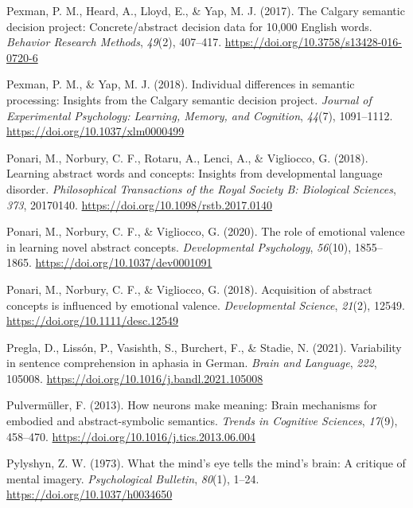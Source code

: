 \documentclass[
  12pt,
  man,floatsintext]{apa7}
\newlength{\cslhangindent}
\newlength{\cslentryspacingunit} %
\newenvironment{CSLReferences}[2] %
 {%
  \setlength{\parindent}{0pt}
  \ifodd #1
  \let\oldpar\par
  \def\par{\hangindent=\cslhangindent\oldpar}
  \fi
  \setlength{\parskip}{#2\cslentryspacingunit}
 }%
 {}
\begin{document}
\begin{CSLReferences}{1}{0}
\leavevmode{}%
Pexman, P. M., Heard, A., Lloyd, E., \& Yap, M. J. (2017). The {Calgary} semantic decision project: {Concrete}/abstract decision data for 10,000 {English} words. \emph{Behavior Research Methods}, \emph{49}(2), 407--417. \url{https://doi.org/10.3758/s13428-016-0720-6}

\leavevmode{}%
Pexman, P. M., \& Yap, M. J. (2018). Individual differences in semantic processing: {Insights} from the {Calgary} semantic decision project. \emph{Journal of Experimental Psychology: Learning, Memory, and Cognition}, \emph{44}(7), 1091--1112. \url{https://doi.org/10.1037/xlm0000499}

\leavevmode{}%
Ponari, M., Norbury, C. F., Rotaru, A., Lenci, A., \& Vigliocco, G. (2018). Learning abstract words and concepts: {Insights} from developmental language disorder. \emph{Philosophical Transactions of the Royal Society B: Biological Sciences}, \emph{373}, 20170140. \url{https://doi.org/10.1098/rstb.2017.0140}

\leavevmode{}%
Ponari, M., Norbury, C. F., \& Vigliocco, G. (2020). The role of emotional valence in learning novel abstract concepts. \emph{Developmental Psychology}, \emph{56}(10), 1855--1865. \url{https://doi.org/10.1037/dev0001091}

\leavevmode{}%
Ponari, M., Norbury, C. F., \& Vigliocco, G. (2018). Acquisition of abstract concepts is influenced by emotional valence. \emph{Developmental Science}, \emph{21}(2), 12549. \url{https://doi.org/10.1111/desc.12549}

\leavevmode{}%
Pregla, D., Lissón, P., Vasishth, S., Burchert, F., \& Stadie, N. (2021). Variability in sentence comprehension in aphasia in {German}. \emph{Brain and Language}, \emph{222}, 105008. \url{https://doi.org/10.1016/j.bandl.2021.105008}

\leavevmode{}%
Pulvermüller, F. (2013). How neurons make meaning: {Brain} mechanisms for embodied and abstract-symbolic semantics. \emph{Trends in Cognitive Sciences}, \emph{17}(9), 458--470. \url{https://doi.org/10.1016/j.tics.2013.06.004}

\leavevmode{}%
Pylyshyn, Z. W. (1973). What the mind's eye tells the mind's brain: {A} critique of mental imagery. \emph{Psychological Bulletin}, \emph{80}(1), 1--24. \url{https://doi.org/10.1037/h0034650}


\end{CSLReferences}
\end{document}
